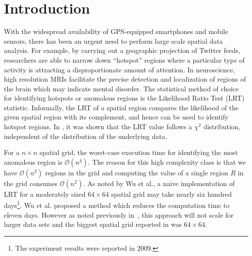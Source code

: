 \documentclass[AMA,LATO1COL]{WileyNJD-v2-bak}
\newcommand\bigo{\mathcal O}
\begin{document}


\maketitle

\section{Introduction}\label{sec1}
With the widespread availability of GPS-equipped smartphones and mobile
sensors, there has been an urgent need to perform large scale spatial data analysis.
For example, by carrying
out a geographic projection of Twitter feeds, researchers are able to
narrow down ``hotspot'' regions where a particular type of activity is attracting a disproportionate  amount of attention. In neuroscience, high resolution MRIs facilitate the precise detection and localization of regions of the brain which may indicate mental disorder.
The statistical method of choice for identifying hotspots or anomalous regions
is the Likelihood Ratio Test (LRT) statistic.
Informally, the LRT of a spatial region compares the likelihood of the given spatial region with its complement, and hence can be used to identify hotspot regions. In \cite{chisquare}, it was shown that the LRT value follows a $\chi^{2}$ distribution, independent of the distribution of the underlying data.

\noindent For a $n\times n$ spatial grid, the worst-case execution time for identifying the most
anomalous region is $\bigo(n^4)$. The reason for this high complexity class is that we have $\bigo(n^2)$ regions in the grid and computing the value of a single region $R$ in the grid consumes $\bigo(n^2)$. As noted by Wu et al.\cite{jour}, a naive implementation of LRT for a moderately sized $64 \times 64$  spatial grid may take nearly six hundred days\footnote{The experiment results were  reported in  2009.}. Wu et al.\cite{jour} proposed a method which reduces the computation time to eleven days. However as noted previously in~\cite{ADMA}, this approach will not scale for larger data sets and the biggest spatial grid reported in\cite{jour} was $64 \times  64$.
\end{document}
